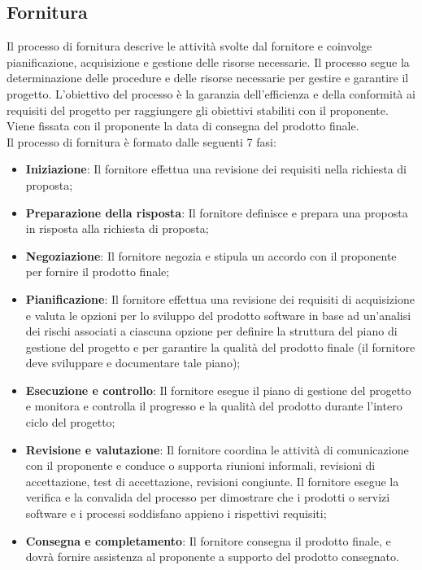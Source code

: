 \documentclass[10pt, a4paper]{article}
\begin{document}
\subsection{Fornitura}
Il processo di fornitura descrive le attività svolte dal fornitore e coinvolge pianificazione, acquisizione e gestione delle risorse 
necessarie. Il processo segue la determinazione delle procedure e delle risorse necessarie per gestire e garantire il progetto.
L'obiettivo del processo è la garanzia dell'efficienza e della conformità ai requisiti del progetto per raggiungere gli obiettivi stabiliti 
con il proponente.\\
Viene fissata con il proponente la data di consegna del prodotto finale.\\
Il processo di fornitura è formato dalle seguenti 7 fasi:
\begin{itemize}
    \item \textbf{Iniziazione}: Il fornitore effettua una revisione dei requisiti nella richiesta di proposta;
    \item \textbf{Preparazione della risposta}: Il fornitore definisce e prepara una proposta in risposta alla richiesta di proposta;
    \item \textbf{Negoziazione}: Il fornitore negozia e stipula un accordo con il proponente per fornire il prodotto finale;
    \item \textbf{Pianificazione}: Il fornitore effettua una revisione dei requisiti di acquisizione e valuta le opzioni per lo 
    sviluppo del prodotto software in base ad un'analisi dei rischi associati a ciascuna opzione per definire la struttura del piano di gestione 
    del progetto e per garantire la qualità del prodotto finale (il fornitore deve sviluppare e documentare tale piano);
    \item \textbf{Esecuzione e controllo}: Il fornitore esegue il piano di gestione del progetto e monitora e controlla il progresso e la qualità
    del prodotto durante l'intero ciclo del progetto;
    \item \textbf{Revisione e valutazione}: Il fornitore coordina le attività di comunicazione con il proponente e conduce o supporta riunioni informali,
    revisioni di accettazione, test di accettazione, revisioni congiunte. Il fornitore  esegue la verifica e la convalida del processo 
    per dimostrare che i prodotti o servizi software e i processi soddisfano appieno i rispettivi requisiti;
    \item \textbf{Consegna e completamento}: Il fornitore consegna il prodotto finale, e dovrà fornire assistenza al proponente a supporto 
    del prodotto consegnato.
\end{itemize}
\end{document}
